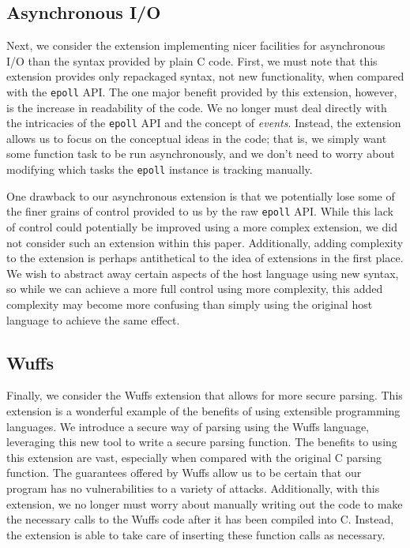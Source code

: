 \documentclass[main.tex]{subfiles}
\begin{document}
\subsection{Asynchronous I/O}
Next, we consider the extension implementing nicer facilities for asynchronous I/O than the syntax provided by plain C code.
First, we must note that this extension provides only repackaged syntax, not new functionality, when compared with the
\verb|epoll| API. The one major benefit provided by this extension, however, is the increase in readability of the code. We no
longer must deal directly with the intricacies of the \verb|epoll| API and the concept of \emph{events}. Instead, the extension
allows us to focus on the conceptual ideas in the code; that is, we simply want some function task to be run asynchronously,
and we don't need to worry about modifying which tasks the \verb|epoll| instance is tracking manually.

One drawback to our asynchronous extension is that we potentially lose some of the finer grains of control provided to us
by the raw \verb|epoll| API. While this lack of control could potentially be improved using a more complex extension, we did
not consider such an extension within this paper. Additionally, adding complexity to the extension is perhaps antithetical to the
idea of extensions in the first place. We wish to abstract away certain aspects of the host language using new syntax,
so while we can achieve a more full control using more complexity, this added complexity may become more confusing than
simply using the original host language to achieve the same effect.

\subsection{Wuffs}
Finally, we consider the Wuffs extension that allows for more secure parsing. This extension is a wonderful example of
the benefits of using extensible programming languages. We introduce a secure way of parsing using the Wuffs language,
leveraging this new tool to write a secure parsing function. The benefits to using this extension are vast, especially when
compared with the original C parsing function. The guarantees offered by Wuffs allow us to be certain that our program has
no vulnerabilities to a variety of attacks. Additionally, with this extension, we no longer must worry about manually writing out
the code to make the necessary calls to the Wuffs code after it has been compiled into C. Instead, the extension is able to
take care of inserting these function calls as necessary.
\end{document}
